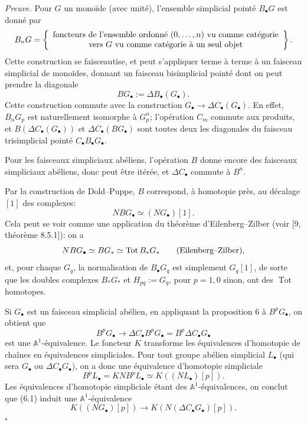 \documentclass[11pt]{article}
\newcommand{\Aone}{\mathbb A^1}
\newcommand{\Tot}{\operatorname{Tot}}
\theoremstyle{deligne}
\newenvironment{proofdel}{\noindent\textit{Preuve.}}{\hfill$\square$}
\begin{document}
\begin{proofdel}
Pour \(G\) un monoïde (avec unité), l'ensemble simplicial pointé \(B_\bullet G\) est donné par
\[
B_nG=\left\{
\begin{array}{c}
\hbox{foncteurs de l'ensemble ordonné }(0,\ldots,n)\hbox{ vu comme catégorie}\\
\hbox{vers }G\hbox{ vu comme catégorie à un seul objet}
\end{array}
\right\}.
\]
Cette construction se faisceautise, et peut s'appliquer terme à terme à un faisceau simplicial de monoïdes, donnant un faisceau bisimplicial pointé dont on peut prendre la diagonale
\[
BG_\bullet:=\Delta B_\bullet(G_\bullet).
\]
Cette construction commute avec la construction \(G_\bullet\to\Delta C_\bullet(G_\bullet)\). En effet, \(B_nG_p\) est naturellement isomorphe à \(G_p^n\); l'opération \(C_m\) commute aux produits, et \(B(\Delta C_\bullet(G_\bullet))\) et \(\Delta C_\bullet(BG_\bullet)\) sont toutes deux les diagonales du faisceau trisimplicial pointé \(C_\bullet B_\bullet G_\bullet\).

Pour les faisceaux simpliciaux abéliens, l'opération \(B\) donne encore des faisceaux simpliciaux abéliens, donc peut être itérée, et \(\Delta C_\bullet\) commute à \(B^n\).

Par la construction de Dold--Puppe, \(B\) correspond, à homotopie près, au décalage \([1]\) des complexes:
\[
NBG_\bullet\simeq(NG_\bullet)[1].
\]
Cela peut se voir comme une application du théorème d'Eilenberg--Zilber (voir [9, théorème 8.5.1]): on a
\[
NBG_\bullet\simeq BG_*\simeq \Tot B_*G_*\qquad\hbox{(Eilenberg--Zilber),}
\]
et, pour chaque \(G_q\), la normalisation de \(B_\bullet G_q\) est simplement \(G_q[1]\), de sorte que les doubles complexes \(B_*G_*\) et \(H_{pq}:=G_q\), pour \(p=1,0\) sinon, ont des \(\Tot\) homotopes.

Si \(G_\bullet\) est un faisceau simplicial abélien, en appliquant la proposition 6 à \(B^pG_\bullet\), on obtient que
\[
B^pG_\bullet\longrightarrow \Delta C_\bullet B^pG_\bullet
       =B^p\Delta C_\bullet G_\bullet                       \tag{6.1}
\]
est une \(\Aone\)-équivalence. Le foncteur \(K\) transforme les équivalences d'homotopie de chaînes en équivalences simpliciales. Pour tout groupe abélien simplicial \(L_\bullet\) (qui sera \(G_\bullet\) ou \(\Delta C_\bullet G_\bullet\)), on a donc une équivalence d'homotopie simpliciale
\[
B^pL_\bullet=KNB^pL_\bullet\simeq K((NL_\bullet)[p]).
\]
Les équivalences d'homotopie simpliciale étant des \(\Aone\)-équivalences, on conclut que (6.1) induit une \(\Aone\)-équivalence
\[
K((NG_\bullet)[p])\longrightarrow K(N(\Delta C_\bullet G_\bullet)[p]).
\]
\end{proofdel}
\end{document}
